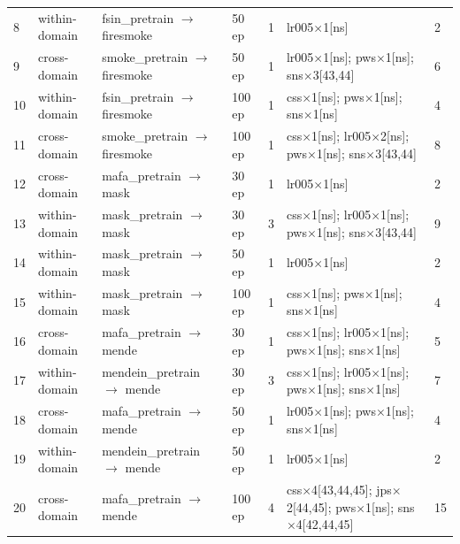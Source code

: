 \documentclass[pdflatex,sn-mathphys-ay]{sn-jnl}
\begin{document}
{\begin{longtable}{p{}p{}p{}p{}p{}p{}p{}}
8 & within-domain & fsin\_pretrain \ensuremath{\rightarrow} firesmoke & 50 ep & 1 & lr005\ensuremath{\times}1[ns] & 2 \\
9 & cross-domain & smoke\_pretrain \ensuremath{\rightarrow} firesmoke & 50 ep & 1 & lr005\ensuremath{\times}1[ns]; pws\ensuremath{\times}1[ns]; sns\ensuremath{\times}3[43,44] & 6 \\
10 & within-domain & fsin\_pretrain \ensuremath{\rightarrow} firesmoke & 100 ep & 1 & css\ensuremath{\times}1[ns]; pws\ensuremath{\times}1[ns]; sns\ensuremath{\times}1[ns] & 4 \\
11 & cross-domain & smoke\_pretrain \ensuremath{\rightarrow} firesmoke & 100 ep & 1 & css\ensuremath{\times}1[ns]; lr005\ensuremath{\times}2[ns]; pws\ensuremath{\times}1[ns]; sns\ensuremath{\times}3[43,44] & 8 \\
12 & cross-domain & mafa\_pretrain \ensuremath{\rightarrow} mask & 30 ep & 1 & lr005\ensuremath{\times}1[ns] & 2 \\
13 & within-domain & mask\_pretrain \ensuremath{\rightarrow} mask & 30 ep & 3 & css\ensuremath{\times}1[ns]; lr005\ensuremath{\times}1[ns]; pws\ensuremath{\times}1[ns]; sns\ensuremath{\times}3[43,44] & 9 \\
14 & within-domain & mask\_pretrain \ensuremath{\rightarrow} mask & 50 ep & 1 & lr005\ensuremath{\times}1[ns] & 2 \\
15 & within-domain & mask\_pretrain \ensuremath{\rightarrow} mask & 100 ep & 1 & css\ensuremath{\times}1[ns]; pws\ensuremath{\times}1[ns]; sns\ensuremath{\times}1[ns] & 4 \\
16 & cross-domain & mafa\_pretrain \ensuremath{\rightarrow} mende & 30 ep & 1 & css\ensuremath{\times}1[ns]; lr005\ensuremath{\times}1[ns]; pws\ensuremath{\times}1[ns]; sns\ensuremath{\times}1[ns] & 5 \\
17 & within-domain & mendein\_pretrain \ensuremath{\rightarrow} mende & 30 ep & 3 & css\ensuremath{\times}1[ns]; lr005\ensuremath{\times}1[ns]; pws\ensuremath{\times}1[ns]; sns\ensuremath{\times}1[ns] & 7 \\
18 & cross-domain & mafa\_pretrain \ensuremath{\rightarrow} mende & 50 ep & 1 & lr005\ensuremath{\times}1[ns]; pws\ensuremath{\times}1[ns]; sns\ensuremath{\times}1[ns] & 4 \\
19 & within-domain & mendein\_pretrain \ensuremath{\rightarrow} mende & 50 ep & 1 & lr005\ensuremath{\times}1[ns] & 2 \\
20 & cross-domain & mafa\_pretrain \ensuremath{\rightarrow} mende & 100 ep & 4 & css\ensuremath{\times}4[43,44,45]; jps\ensuremath{\times}2[44,45]; pws\ensuremath{\times}1[ns]; sns\ensuremath{\times}4[42,44,45] & 15 \\

\end{longtable}}
\end{document}
